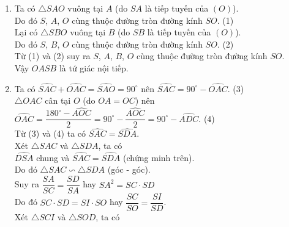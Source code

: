 \begin{bt}[2,5 điểm]
{\begin{center}
		\end{center}
		\begin{enumerate}
			\item Ta có $\triangle S A O$ vuông tại $A$ (do $S A$ là tiếp tuyến của $(O)$).\\
			Do đó $S$, $A$, $O$ cùng thuộc đường tròn đường kính $SO$. (1)\\ Lại có $\triangle SBO$ vuông tại $B$ (do $S B$ là tiếp tuyến của $(O)$).\\
			Do đó $S$, $B$, $O$ cùng thuộc đường tròn đường kính $SO$. (2)\\
			Từ (1) và (2) suy ra $S$, $A$, $B$, $O$ cùng thuộc đường tròn đường kính $SO$.\\
			Vậy $OASB$ là tứ giác nội tiếp.
			\item Ta có $\widehat{SAC}+\widehat{OAC}=\widehat{SAO}=90^{\circ}$ nên $\widehat{SAC}=90^{\circ}-\widehat{OAC}$. (3)\\
			$\triangle O A C$ cân tại $O$ (do $OA=OC$) nên
			$\widehat{OAC}=\dfrac{180^{\circ}-\widehat{AOC}}{2}=90^{\circ}-\dfrac{\widehat{AOC}}{2}=90^{\circ}-\widehat{ADC}$. (4)\\
			Từ (3) và (4) ta có $\widehat{S A C}=\widehat{S D A}$.\\
			Xét $\triangle S A C$ và $\triangle S D A$, ta có\\
			$\widehat{DSA}$ chung và $\widehat{SAC}=\widehat{SDA}$ (chứng minh trên).\\
			Do đó $\triangle SAC \backsim \triangle SDA$ (góc - góc).\\
			Suy ra $\dfrac{S A}{S C}=\dfrac{S D}{S A}$ hay $S A^2=S C \cdot S D$\\
			Do đó $SC \cdot SD=SI \cdot SO$ hay $\dfrac{SC}{SO}=\dfrac{SI}{SD}$.\\
			Xét $\triangle SCI$ và $\triangle SOD$, ta có\\

\end{enumerate}}
\end{bt}
